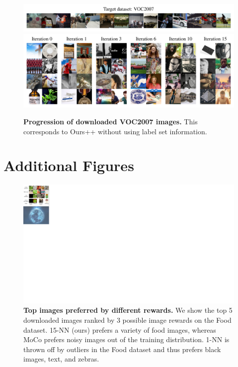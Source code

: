 \begin{figure}
    \centering
    \includegraphics{figures/voc_targets.pdf} \\
    \vspace{-0.8em}
    \includegraphics{figures/voc-progression-1156-2col.pdf}
    \caption{\textbf{Progression of downloaded VOC2007 images.} This corresponds to Ours++ without using label set information. }
    \label{fig:voc_progression}
\end{figure}



\section{Additional Figures}
\begin{figure}
    \centering
    \includegraphics[width=0.5\linewidth]{figures/reward_ranking.pdf}
    \caption{\textbf{Top images preferred by different rewards.} We show the top 5 downloaded images ranked by 3 possible image rewards on the Food dataset. 15-NN (ours) prefers a variety of food images, whereas MoCo prefers noisy images out of the training distribution. 1-NN is thrown off by outliers in the Food dataset and thus prefers black images, text, and zebras.}
    \label{fig:reward_ranking}
\end{figure}

